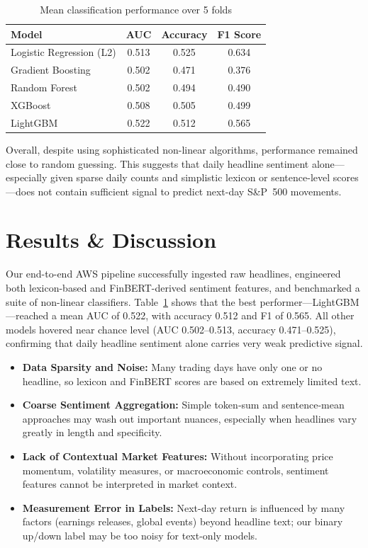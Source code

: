 \documentclass[11pt,a4paper]{article}
\begin{document}
\begin{table}[h]
\centering
\caption{Mean classification performance over 5 folds}
\label{tab:model-results}
\begin{tabular}{lccc}
\toprule
\textbf{Model}                & \textbf{AUC} & \textbf{Accuracy} & \textbf{F1 Score} \\
\midrule
Logistic Regression (L2)      & 0.513        & 0.525             & 0.634             \\
Gradient Boosting             & 0.502        & 0.471             & 0.376             \\
Random Forest                 & 0.502        & 0.494             & 0.490             \\
XGBoost                       & 0.508        & 0.505             & 0.499             \\
LightGBM                      & 0.522        & 0.512             & 0.565             \\
\bottomrule
\end{tabular}
\end{table}

Overall, despite using sophisticated non-linear algorithms, performance remained close to random guessing. This suggests that daily headline sentiment alone—especially given sparse daily counts and simplistic lexicon or sentence-level scores—does not contain sufficient signal to predict next-day S\&P~500 movements.


\section{Results \& Discussion}

Our end-to-end AWS pipeline successfully ingested raw headlines, engineered both lexicon-based and FinBERT-derived sentiment features, and benchmarked a suite of non-linear classifiers. Table~\ref{tab:model-results} shows that the best performer—LightGBM—reached a mean AUC of 0.522, with accuracy 0.512 and F1 of 0.565. All other models hovered near chance level (AUC 0.502–0.513, accuracy 0.471–0.525), confirming that daily headline sentiment alone carries very weak predictive signal.

\begin{itemize}
  \item \textbf{Data Sparsity and Noise:} Many trading days have only one or no headline, so lexicon and FinBERT scores are based on extremely limited text.  
  \item \textbf{Coarse Sentiment Aggregation:} Simple token‐sum and sentence‐mean approaches may wash out important nuances, especially when headlines vary greatly in length and specificity.  
  \item \textbf{Lack of Contextual Market Features:} Without incorporating price momentum, volatility measures, or macroeconomic controls, sentiment features cannot be interpreted in market context.  
  \item \textbf{Measurement Error in Labels:} Next-day return is influenced by many factors (earnings releases, global events) beyond headline text; our binary up/down label may be too noisy for text-only models.
\end{itemize}
\end{document}

